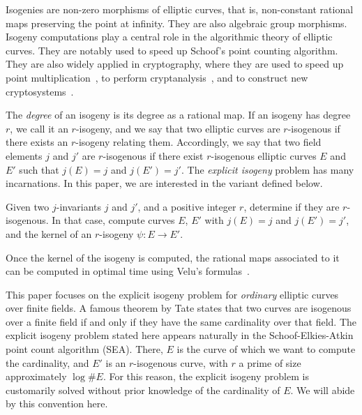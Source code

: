 \documentclass{lms}
\begin{document}
Isogenies are non-zero morphisms of elliptic curves, that is,
non-constant rational maps preserving the point at infinity. They are
also algebraic group morphisms. Isogeny computations play a central
role in the algorithmic theory of elliptic curves. They are notably
used to speed up Schoof's point counting
algorithm\cite{schoof85,atkin88,elkies92,schoof95,elkies98}. They are
also widely applied in cryptography, where they are used to speed up
point multiplication~\cite{gallant+lambert+vanstone01,birkner+sica11},
to perform cryptanalysis~\cite{mauer+menezes+teske01}, and to
construct new
cryptosystems~\cite{teske06,charles+lauter+goren09,Stol,defeo+jao+plut12,jao+soukharev2014-signatures}.

The \emph{degree} of an isogeny is its degree as a rational map. If an
isogeny has degree $r$, we call it an $r$-isogeny, and we say that two
elliptic curves are $r$-isogenous if there exists an $r$-isogeny
relating them. Accordingly, we say that two field elements $j$ and
$j'$ are $r$-isogenous if there exist $r$-isogenous elliptic curves
$E$ and $E'$ such that $j(E)=j$ and $j(E')=j'$. The
\emph{explicit isogeny} problem has many incarnations. In this paper,
we are interested in the variant defined below.

\begin{prob} \label{prob:isogeny-problem}
  Given two $j$-invariants $j$ and $j'$, and a positive integer
  $r$, determine if they are $r$-isogenous. In that case, compute
  curves $E$, $E'$ with $j(E)=j$ and $j(E')=j'$, and the
  kernel of an $r$-isogeny $ψ:E\to E'$.
\end{prob}

Once the kernel of the isogeny is computed, the rational maps
associated to it can be computed in optimal time using Velu's
formulas~\cite{velu71}.

This paper focuses on the explicit isogeny problem for \emph{ordinary}
elliptic curves over finite fields. A famous theorem by Tate states
that two curves are isogenous over a finite field if and only if they
have the same cardinality over that field. The explicit isogeny
problem stated here appears naturally in the Schoof-Elkies-Atkin point
count algorithm (SEA). There, $E$ is the curve of which we want to
compute the cardinality, and $E'$ is an $r$-isogenous curve, with $r$
a prime of size approximately $\log\#E$. For this reason, the explicit
isogeny problem is customarily solved without prior knowledge of the
cardinality of $E$. We will abide by this convention here.
\end{document}
